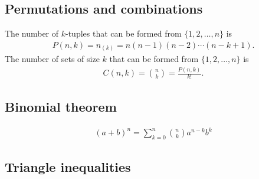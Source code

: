 \subsection{Permutations and combinations}

\begin{theorem*}
  The number of $k$-tuples that can be formed from $\{1, 2, \ldots, n\}$ is
  \begin{align*}
    P(n, k) = n_{(k)} = n(n-1)(n-2)\cdots(n-k+1).
  \end{align*}
  The number of sets of size $k$ that can be formed from $\{1, 2, \ldots, n\}$ is
  \begin{align*}
    C(n, k) = {n \choose k} = \frac{P(n, k)}{k!}.
  \end{align*}
\end{theorem*}

\subsection{Binomial theorem}
\begin{align*}
  (a + b)^n = \sum_{k=0}^n{n \choose k}a^{n-k}b^k
\end{align*}

\subsection{Triangle inequalities}

